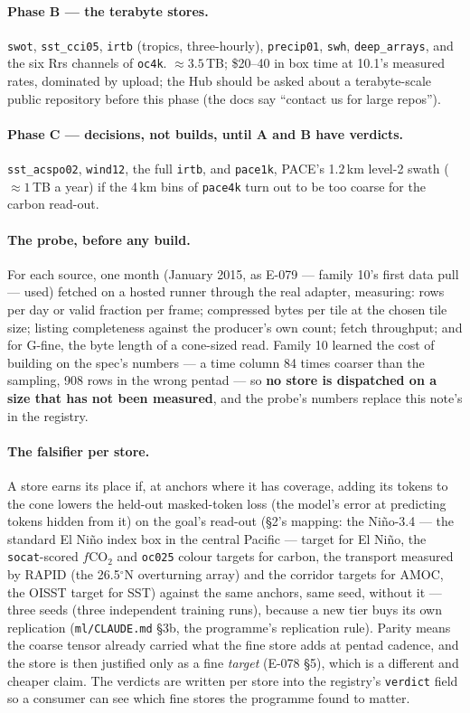 \documentclass[10pt]{article}
\newcommand{\code}[1]{\texttt{#1}}
\begin{document}
\paragraph{Phase B --- the terabyte stores.} \code{swot}, \code{sst\_cci05},
\code{irtb} (tropics, three-hourly), \code{precip01}, \code{swh},
\code{deep\_arrays}, and the six Rrs channels of \code{oc4k}. $\approx 3.5$\,TB;
\$20--40 in box time at 10.1's measured rates, dominated by upload; the Hub
should be asked about a terabyte-scale public repository before this phase
(the docs say ``contact us for large repos'').

\paragraph{Phase C --- decisions, not builds, until A and B have verdicts.}
\code{sst\_acspo02}, \code{wind12}, the full \code{irtb}, and \code{pace1k},
PACE's 1.2\,km level-2 swath ($\approx 1$\,TB a year) if the 4\,km bins of
\code{pace4k} turn out to be too coarse for the carbon read-out.

\paragraph{The probe, before any build.} For each source, one month
(January 2015, as E-079 --- family 10's first data pull --- used) fetched on a hosted runner through the real
adapter, measuring: rows per day or valid fraction per frame; compressed
bytes per tile at the chosen tile size; listing completeness against the
producer's own count; fetch throughput; and for G-fine, the byte length of a
cone-sized read. Family 10 learned the cost of building on the spec's numbers
--- a time column 84 times coarser than the sampling, 908 rows in the wrong
pentad --- so \textbf{no store is dispatched on a size that has not been
measured}, and the probe's numbers replace this note's in the registry.

\paragraph{The falsifier per store.} A store earns its place if, at anchors
where it has coverage, adding its tokens to the cone lowers the held-out
masked-token loss (the model's error at predicting tokens hidden from it) on the goal's read-out (\S2's mapping: the Ni\~no-3.4 --- the standard El Ni\~no index box in the central Pacific ---
target for El Ni\~no, the \code{socat}-scored $f$CO$_2$ and \code{oc025}
colour targets for carbon, the transport measured by RAPID (the 26.5$^\circ$N overturning array) and the corridor targets for AMOC,
the OISST target for SST) against the same anchors, same seed, without it ---
three seeds (three independent training runs), because a new tier buys its own replication (\code{ml/CLAUDE.md}
\S3b, the programme's replication rule). Parity means the coarse tensor already carried what the fine store
adds at pentad cadence, and the store is then justified only as a fine
\emph{target} (E-078 \S5), which is a different and cheaper claim. The
verdicts are written per store into the registry's \code{verdict} field so a
consumer can see which fine stores the programme found to matter.
\end{document}
